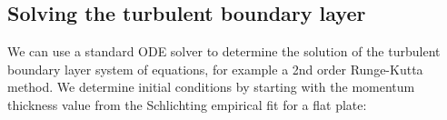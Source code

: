 











\subsection{Solving the turbulent boundary layer}

We can use a standard ODE solver to determine the solution of the turbulent boundary layer system of equations, for example a 2nd order Runge-Kutta method.
%
We determine initial conditions by starting with the momentum thickness value from the Schlichting empirical fit for a flat plate:

